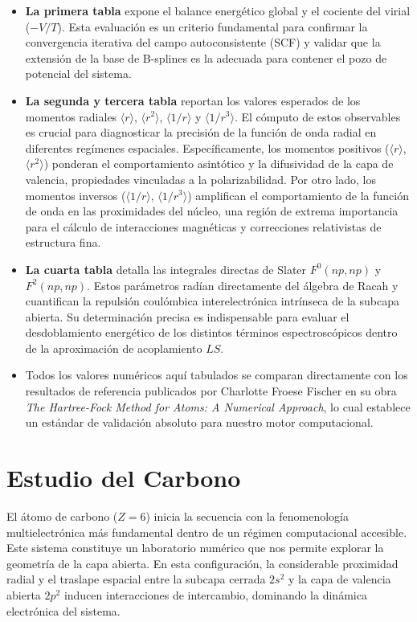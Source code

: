 \documentclass[12pt,a4paper]{book}
\begin{document}
\begin{itemize}
    \item \textbf{La primera tabla} expone el balance energético global y el cociente del virial ($-V/T$). Esta evaluación es un criterio fundamental para confirmar la convergencia iterativa del campo autoconsistente (SCF) y validar que la extensión de la base de B-splines es la adecuada para contener el pozo de potencial del sistema.
    \item \textbf{La segunda y tercera tabla} reportan los valores esperados de los momentos radiales $\langle r \rangle$, $\langle r^2 \rangle$, $\langle 1/r \rangle$ y $\langle 1/r^3 \rangle$. El cómputo de estos observables es crucial para diagnosticar la precisión de la función de onda radial en diferentes regímenes espaciales. Específicamente, los momentos positivos ($\langle r \rangle$, $\langle r^2 \rangle$) ponderan el comportamiento asintótico y la difusividad de la capa de valencia, propiedades vinculadas a la polarizabilidad. Por otro lado, los momentos inversos ($\langle 1/r \rangle$, $\langle 1/r^3 \rangle$) amplifican el comportamiento de la función de onda en las proximidades del núcleo, una región de extrema importancia para el cálculo de interacciones magnéticas y correcciones relativistas de estructura fina.
    \item \textbf{La cuarta tabla} detalla las integrales directas de Slater $F^0(np,np)$ y $F^2(np,np)$. Estos parámetros radían directamente del álgebra de Racah y cuantifican la repulsión coulómbica interelectrónica intrínseca de la subcapa abierta. Su determinación precisa es indispensable para evaluar el desdoblamiento energético de los distintos términos espectroscópicos dentro de la aproximación de acoplamiento $LS$.
    \item Todos los valores numéricos aquí tabulados se comparan directamente con los resultados de referencia publicados por Charlotte Froese Fischer en su obra \textit{The Hartree-Fock Method for Atoms: A Numerical Approach}, lo cual establece un estándar de validación absoluto para nuestro motor computacional.
\end{itemize}

\section{Estudio del Carbono}

El átomo de carbono ($Z=6$) inicia la secuencia con la fenomenología multielectrónica más fundamental dentro de un régimen computacional accesible. Este sistema constituye un laboratorio numérico que nos permite explorar la geometría de la capa abierta. En esta configuración, la considerable proximidad radial y el traslape espacial entre la subcapa cerrada $2s^2$ y la capa de valencia abierta $2p^2$ inducen interacciones de intercambio, dominando la dinámica electrónica del sistema.
\end{document}
